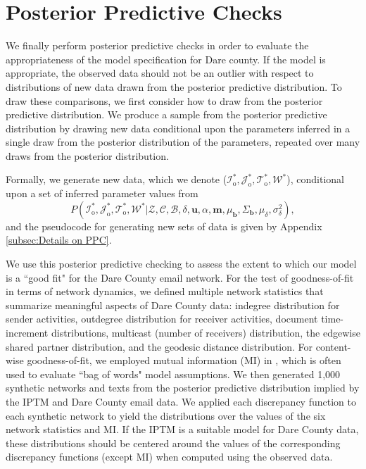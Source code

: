 \section{Posterior Predictive Checks}

We finally perform posterior predictive checks \cite{rubin1984bayesianly} in order to evaluate the appropriateness of the model specification for Dare county. If the model is appropriate, the observed data should not be an outlier with respect to distributions of new data drawn from the posterior predictive distribution. To draw these comparisons, we first consider how to draw from the posterior predictive distribution. We produce a sample from the posterior predictive distribution by drawing new data conditional upon the parameters inferred in a single draw from the posterior distribution of the parameters, repeated over many draws from the posterior distribution. 

Formally, we generate new data, which we denote ($\mathcal{I}_{\mbox{o}}^*, \mathcal{J}_{\mbox{o}}^*, \mathcal{T}_{\mbox{o}}^*,\mathcal{W}^*$), conditional upon a set of inferred parameter values from
\begin{equation}
P(\mathcal{I}_{\mbox{o}}^*, \mathcal{J}_{\mbox{o}}^*, \mathcal{T}_{\mbox{o}}^*,\mathcal{W}^* |\mathcal{Z}, \mathcal{C}, \mathcal{B}, \delta,\boldsymbol{u}, \alpha, \boldsymbol{m}, \mu_{\boldsymbol{b}}, \Sigma_{\boldsymbol{b}}, \mu_\delta, \sigma^2_\delta),
\label{eqn:backwardssample}
\end{equation}
and the pseudocode for generating new sets of data is given by Appendix \ref{subsec:Details on PPC}.

 We use this posterior predictive checking to assess the extent to which our model is a ``good fit" for the Dare County email network. For the test of goodness-of-fit in terms of network dynamics, we defined multiple network statistics that summarize meaningful aspects of Dare County data: indegree distribution for sender activities, outdegree distribution for receiver activities, document time-increment distributions, multicast (number of receivers) distribution, the edgewise shared partner distribution, and the geodesic distance distribution. For content-wise goodness-of-fit, we employed mutual information (MI) in \cite{mimno2011bayesian}, which is often used to evaluate ``bag of words" model assumptions. We then generated 1,000 synthetic networks and texts from the posterior predictive distribution implied by the IPTM and Dare County email data.
We applied each discrepancy function to each synthetic network to yield the distributions over the values of the six network statistics and MI. If the IPTM is a suitable model for Dare County data, these distributions should be centered around the values of the corresponding discrepancy functions (except MI) when computed using the observed data. 

